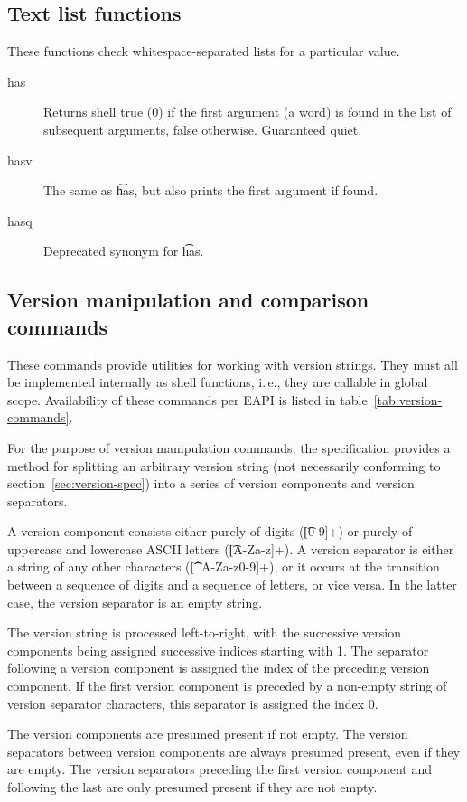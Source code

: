 \subsection{Text list functions}
These functions check whitespace-separated lists for a particular value.
\nobreakpar
\begin{description}
\item[has] Returns shell true (0) if the first argument (a word) is found in the list of subsequent
    arguments, false otherwise. Guaranteed quiet.
\item[hasv] The same as \t{has}, but also prints the first argument if found.
\item[hasq] Deprecated synonym for \t{has}.
\end{description}

\subsection{Version manipulation and comparison commands}
These commands provide utilities for working with version strings. They must all be implemented
internally as shell functions, i.\,e., they are callable in global scope. Availability of these
commands per EAPI is listed in table~\ref{tab:version-commands}.

For the purpose of version manipulation commands, the specification provides a method for splitting
an arbitrary version string (not necessarily conforming to section~\ref{sec:version-spec}) into
a series of version components and version separators.

A version component consists either purely of digits (\t{[0-9]+}) or purely of uppercase and
lowercase ASCII letters (\t{[A-Za-z]+}). A version separator is either a string of any other
characters (\t{[\textasciicircum A-Za-z0-9]+}), or it occurs at the transition between a sequence
of digits and a sequence of letters, or vice versa. In the latter case, the version separator is
an empty string.

The version string is processed left-to-right, with the successive version components being assigned
successive indices starting with 1. The separator following a version component is assigned
the index of the preceding version component. If the first version component is preceded by
a non-empty string of version separator characters, this separator is assigned the index 0.

The version components are presumed present if not empty. The version separators between version
components are always presumed present, even if they are empty. The version separators preceding
the first version component and following the last are only presumed present if they are not empty.

